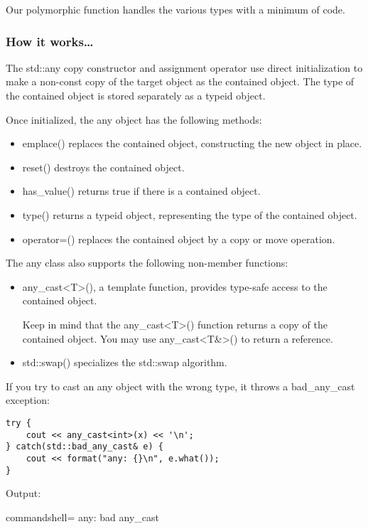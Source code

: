 Our polymorphic function handles the various types with a minimum of code.

\subsubsection{How it works…}

The std::any copy constructor and assignment operator use direct initialization to make a non-const copy of the target object as the contained object. The type of the contained object is stored separately as a typeid object.

Once initialized, the any object has the following methods:

\begin{itemize}
\item 
emplace() replaces the contained object, constructing the new object in place.

\item 
reset() destroys the contained object.

\item 
has\_value() returns true if there is a contained object.

\item 
type() returns a typeid object, representing the type of the contained object.

\item 
operator=() replaces the contained object by a copy or move operation.
\end{itemize}

The any class also supports the following non-member functions:

\begin{itemize}
\item 
any\_cast<T>(), a template function, provides type-safe access to the contained object.

Keep in mind that the any\_cast<T>() function returns a copy of the contained object. You may use any\_cast<T\&>() to return a reference.

\item 
std::swap() specializes the std::swap algorithm.
\end{itemize}

If you try to cast an any object with the wrong type, it throws a bad\_any\_cast exception:

\begin{lstlisting}[style=styleCXX]
try {
	cout << any_cast<int>(x) << '\n';
} catch(std::bad_any_cast& e) {
	cout << format("any: {}\n", e.what());
}
\end{lstlisting}

Output:

\begin{tcblisting}{commandshell={}}
any: bad any_cast
\end{tcblisting}

















